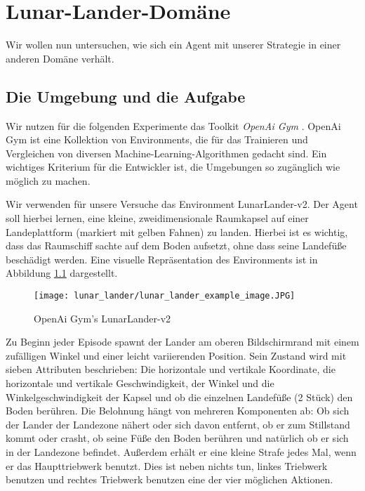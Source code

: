 \chapter{Lunar-Lander-Domäne}\label{sec:LunaLander}
Wir wollen nun untersuchen, wie sich ein Agent mit unserer Strategie in einer anderen Domäne verhält.

\section{Die Umgebung und die Aufgabe}
Wir nutzen für die folgenden Experimente das Toolkit \textit{OpenAi Gym} \cite{x03_openaiGym}. OpenAi Gym ist eine Kollektion von Environments, die für das Trainieren und Vergleichen von diversen Machine-Learning-Algorithmen gedacht sind. Ein wichtiges Kriterium für die Entwickler ist, die Umgebungen so zugänglich wie möglich zu machen.

Wir verwenden für unsere Versuche das Environment \glqq LunarLander-v2\grqq{}. Der Agent soll hierbei lernen, eine kleine, zweidimensionale Raumkapsel auf einer Landeplattform (markiert mit gelben Fahnen) zu landen. Hierbei ist es wichtig, dass das Raumschiff sachte auf dem Boden aufsetzt, ohne dass seine Landefüße beschädigt werden. Eine visuelle Repräsentation des Environments ist in Abbildung \ref{img:lunarLanderExample} dargestellt.

\begin{figure}[h!]
    \centering
    \texttt{[image: lunar\_lander/lunar\_lander\_example\_image.JPG]}
    \caption{OpenAi Gym's \glqq LunarLander-v2\grqq{}} \label{img:lunarLanderExample}
\end{figure}

Zu Beginn jeder Episode spawnt der Lander am oberen Bildschirmrand mit einem zufälligen Winkel und einer leicht variierenden Position. Sein Zustand wird mit sieben Attributen beschrieben: Die horizontale und vertikale Koordinate, die horizontale und vertikale Geschwindigkeit, der Winkel und die Winkelgeschwindigkeit der Kapsel und ob die einzelnen Landefüße (2 Stück) den Boden berühren. Die Belohnung hängt von mehreren Komponenten ab: Ob sich der Lander der Landezone nähert oder sich davon entfernt, ob er zum Stillstand kommt oder crasht, ob seine Füße den Boden berühren und natürlich ob er sich in der Landezone befindet. Außerdem erhält er eine kleine Strafe jedes Mal, wenn er das Haupttriebwerk benutzt. Dies ist neben nichts tun, linkes Triebwerk benutzen und rechtes Triebwerk benutzen eine der vier möglichen Aktionen.

